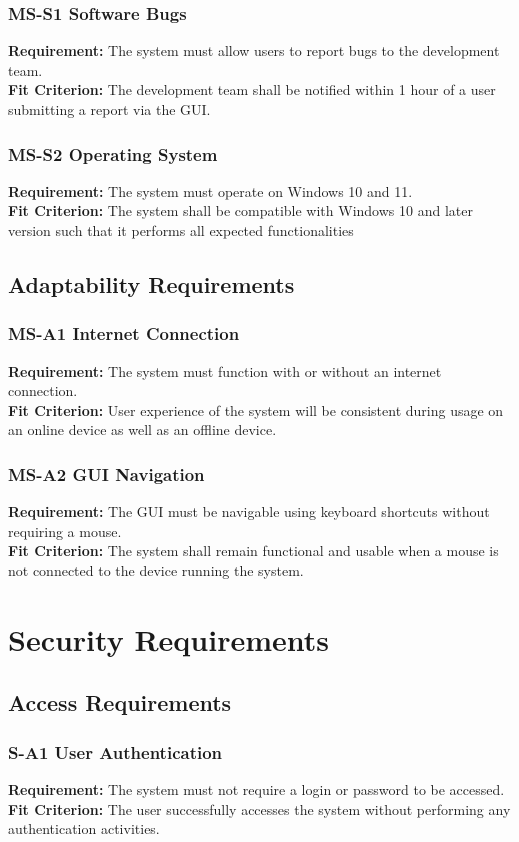 \documentclass[12pt]{article}
\begin{document}
\subsubsection*{MS-S1 Software Bugs} \label{MS-S1}
\textbf{Requirement:} The system must allow users to report bugs to the development team. \\ 
\textbf{Fit Criterion:} The development team shall be notified within 1 hour of a user submitting a report via the GUI.
\subsubsection*{MS-S2 Operating System} \label{MS-S2}
\textbf{Requirement:} The system must operate on Windows 10 and 11. \\ 
\textbf{Fit Criterion:} The system shall be compatible with Windows 10 and later version such that it performs all expected functionalities

\subsection{Adaptability Requirements}
\subsubsection*{MS-A1 Internet Connection} \label{MS-A1}
\textbf{Requirement:} The system must function with or without an internet connection. \\ 
\textbf{Fit Criterion:} User experience of the system will be consistent during usage on an online device as well as an offline device.
\subsubsection*{MS-A2 GUI Navigation} \label{MS-A2}
\textbf{Requirement:} The GUI must be navigable using keyboard shortcuts without requiring a mouse. \\ 
\textbf{Fit Criterion:} The system shall remain functional and usable when a mouse is not connected to the device running the system.


\section{Security Requirements}
\subsection{Access Requirements}
\subsubsection*{S-A1 User Authentication} \label{S-A1}
\textbf{Requirement:} The system must not require a login or password to be accessed. \\ 
\textbf{Fit Criterion:} The user successfully accesses the system without performing any authentication activities.
\end{document}
